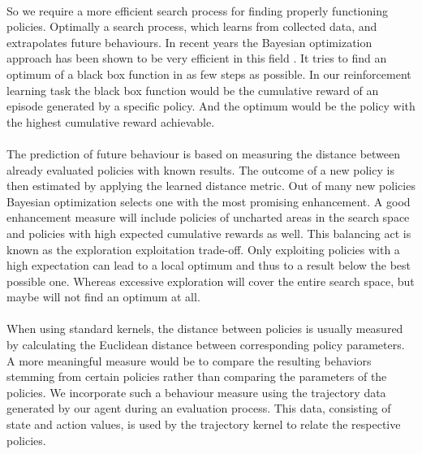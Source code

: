 \\
So we require a more efficient search process for finding properly functioning policies. Optimally a search process, which learns from collected data, and extrapolates future behaviours. In recent years the Bayesian optimization approach has been shown to be very efficient in this field \cite{brochu2010tutorial, shahriari2016taking, lizotte2008practical}. It tries to find an optimum of a black box function in as few steps as possible. In our reinforcement learning task the black box function would be the cumulative reward of an episode generated by a specific policy. And the optimum would be the policy with the highest cumulative reward achievable.\\
\\
The prediction of future behaviour is based on measuring the distance between already evaluated policies with known results. The outcome of a new policy is then estimated by applying the learned distance metric. Out of many new policies Bayesian optimization selects one with the most promising enhancement. A good enhancement measure will include policies of uncharted areas in the search space and policies with high expected cumulative rewards as well. This balancing act is known as the exploration exploitation trade-off. Only exploiting policies with a high expectation can lead to a local optimum and thus to a result below the best possible one. Whereas excessive exploration will cover the entire search space, but maybe will not find an optimum at all.\\
\\
When using standard kernels, the distance between policies is usually measured by calculating the Euclidean distance between corresponding policy parameters. A more meaningful measure would be to compare the resulting behaviors stemming from certain policies rather than comparing the parameters of the policies. We incorporate such a behaviour measure using the trajectory data generated by our agent during an evaluation process. This data, consisting of state and action values, is used by the trajectory kernel to relate the respective policies.\\
\\
